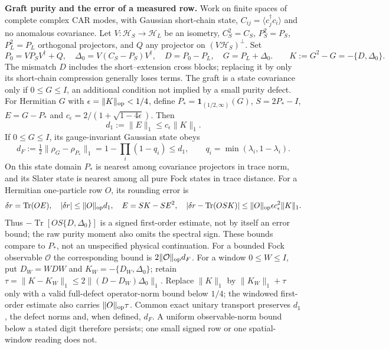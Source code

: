
\noindent\textbf{Graft purity and the error of a measured row.}
Work on finite spaces of complete complex CAR modes, with Gaussian short-chain state,
$C_{ij}=\langle c_j^\dagger c_i\rangle$ and no anomalous covariance.
Let $V:\mathcal H_S\to\mathcal H_L$ be an isometry,
$C_S^2=C_S$, $P_S^2=P_S$, $P_L^2=P_L$ orthogonal projectors, and
$Q$ any projector on $(V\mathcal H_S)^\perp$. Set
\[
 P_0=VP_SV^\dagger+Q,\quad
 \Delta_0=V(C_S-P_S)V^\dagger,\quad D=P_0-P_L,\quad G=P_L+\Delta_0.
 \qquad K:=G^2-G=-\{D,\Delta_0\}.
\]
The mismatch $D$ includes the short--extension cross blocks; replacing
it by only its short-chain compression generally loses terms.
The graft is a state covariance only if $0\leq G\leq I$, an additional
condition not implied by a small purity defect. For Hermitian $G$ with
$\epsilon=\|K\|_{\rm op}<1/4$, define
$P_*=\mathbf1_{(1/2,\infty)}(G)$, $S=2P_*-I$, $E=G-P_*$ and
$c_\epsilon=2/(1+\sqrt{1-4\epsilon})$. Then
\[
 d_1:=\|E\|_1\leq c_\epsilon\|K\|_1.
\]
If $0\leq G\leq I$, its gauge-invariant Gaussian state obeys
\[
 d_F:=\tfrac12\|\rho_G-\rho_{P_*}\|_1
 =1-\prod_i(1-q_i)\leq d_1,\qquad q_i=\min(\lambda_i,1-\lambda_i).
\]
On this state domain $P_*$ is nearest among covariance projectors in trace norm, and its
Slater state is nearest among all pure Fock states in trace distance.
For a Hermitian one-particle row $O$, its rounding error is
\[
 \delta r=\operatorname{Tr}(OE),\quad
 |\delta r|\leq\|O\|_{\rm op}d_1,\quad
 E=S K - S E^2,\quad
 |\delta r-\operatorname{Tr}(OSK)|
 \leq\|O\|_{\rm op}\epsilon c_\epsilon^2\|K\|_1.
\]
Thus $-\operatorname{Tr}[OS\{D,\Delta_0\}]$ is a signed first-order
estimate, not by itself an error bound; the raw purity moment also
omits the spectral sign. These bounds compare to $P_*$, not an
unspecified physical continuation. For a bounded Fock observable
$\mathcal O$ the corresponding bound is $2\|\mathcal O\|_{\rm op}d_F$.
For a window $0\leq W\leq I$, put $D_W=WDW$ and
$K_W=-\{D_W,\Delta_0\}$; retain
$\tau=\|K-K_W\|_1\leq2\|(D-D_W)\Delta_0\|_1$.
Replace $\|K\|_1$ by $\|K_W\|_1+\tau$ only with a valid full-defect
operator-norm bound below $1/4$; the windowed first-order estimate
also carries $\|O\|_{\rm op}\tau$.
Common exact unitary transport preserves $d_1$, the defect norms and,
when defined, $d_F$.
A uniform observable-norm bound below a stated digit therefore persists;
one small signed row or one spatial-window reading does not.

